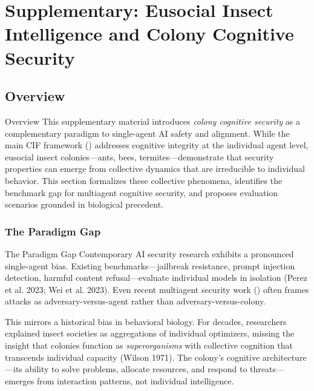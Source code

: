 \documentclass[
  ignorenonframetext,
]{beamer}
\author{\texorpdfstring{}{}}
\date{}
\providecommand{\cref}[1]{\texttt{\detokenize{#1}}}
\begin{document}
\begin{frame}
\newpage
\end{frame}

\section{Supplementary: Eusocial Insect Intelligence and Colony
Cognitive Security}\label{sec:eusocial-cogsec}

\subsection{Overview}\label{sec:eusocial-overview}

\begin{frame}[allowframebreaks]{Overview}
This supplementary material introduces \emph{colony cognitive security}
as a complementary paradigm to single-agent AI safety and alignment.
While the main CIF framework (\cref{sec:formal-framework}) addresses
cognitive integrity at the individual agent level, eusocial insect
colonies---ants, bees, termites---demonstrate that security properties
can emerge from collective dynamics that are irreducible to individual
behavior. This section formalizes these collective phenomena, identifies
the benchmark gap for multiagent cognitive security, and proposes
evaluation scenarios grounded in biological precedent.
\end{frame}

\subsubsection{The Paradigm Gap}\label{sec:paradigm-gap}

\begin{frame}[allowframebreaks]{The Paradigm Gap}
Contemporary AI security research exhibits a pronounced single-agent
bias. Existing benchmarks---jailbreak resistance, prompt injection
detection, harmful content refusal---evaluate individual models in
isolation ({Perez et al.} 2023; Wei et al. 2023). Even recent multiagent
security work (\cref{sec:threat-model}) often frames attacks as
adversary-versus-agent rather than adversary-versus-colony.

This mirrors a historical bias in behavioral biology. For decades,
researchers explained insect societies as aggregations of individual
optimizers, missing the insight that colonies function as
\emph{superorganisms} with collective cognition that transcends
individual capacity (Wilson 1971). The colony's cognitive
architecture---its ability to solve problems, allocate resources, and
respond to threats---emerges from interaction patterns, not individual
intelligence.

\end{frame}
\end{document}
